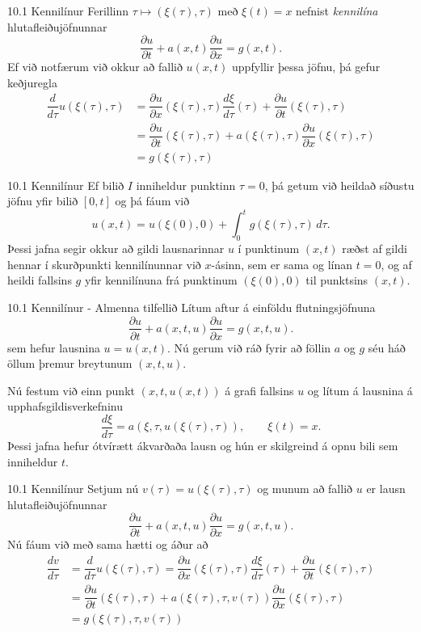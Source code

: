 \begin{frame}{10.1 Kennilínur} 
Ferillinn  $\tau\mapsto (\xi(\tau), \tau)$ með $\xi(t)=x$ nefnist
{\it kennilína} hlutafleiðujöfnunnar
$$
\dfrac{\partial u}{\partial t}
+a(x,t)\dfrac{\partial u}{\partial x}=g(x,t).
$$
Ef við  notfærum við okkur að fallið $u(x,t)$ uppfyllir
þessa jöfnu, þá gefur keðjuregla 
\begin{align*}
\dfrac {d}{d\tau} u(\xi(\tau),\tau)&= 
\dfrac{\partial u}{\partial x}(\xi(\tau),\tau) 
\dfrac{d\xi}{d\tau}(\tau)+
\dfrac{\partial u}{\partial t}(\xi(\tau),\tau)\\
&=\dfrac{\partial u}{\partial t}(\xi(\tau),\tau)
+a(\xi(\tau),\tau)
\dfrac{\partial u}{\partial x}(\xi(\tau),\tau) \\
&=g(\xi(\tau),\tau)  
\end{align*}
\end{frame}


\begin{frame}{10.1 Kennilínur} 
Ef bilið $I$ inniheldur punktinn $\tau=0$, þá getum við heildað
síðustu jöfnu yfir bilið $[0,t]$ og þá fáum við 
$$
u(x,t)=u(\xi(0),0)+\int_0^tg(\xi(\tau),\tau)\, d\tau.
$$
Þessi jafna segir okkur að gildi lausnarinnar $u$ í punktinum $(x,t)$
ræðst af gildi hennar í skurðpunkti kennilínunnar við $x$-ásinn, sem
er sama og línan $t=0$, og af heildi fallsins  $g$ yfir kennilínuna
frá punktinum $(\xi(0),0)$ til punktsins $(x,t)$.
\end{frame}


\begin{frame}{10.1 Kennilínur - Almenna tilfellið} 
Lítum aftur á einföldu flutningsjöfnuna 
$$
\dfrac{\partial u}{\partial t}
+a(x,t,u)\dfrac{\partial u}{\partial x}=g(x,t,u).
$$
sem hefur lausnina $u=u(x,t)$.  Nú gerum við ráð fyrir 
að föllin $a$ og $g$ séu háð öllum þremur breytunum 
$(x,t,u)$. 

\smallskip
Nú festum við einn punkt $(x,t,u(x,t))$ á grafi fallsins 
$u$ og lítum á lausnina á upphafsgildisverkefninu
$$
  \dfrac{d\xi}{d\tau}=a(\xi,\tau,u(\xi(\tau),\tau)), \qquad \xi(t)=x.
$$
Þessi jafna hefur ótvírætt ákvarðaða lausn og hún er skilgreind 
á opnu bili sem inniheldur $t$.  
\end{frame}


\begin{frame}{10.1 Kennilínur} 
Setjum nú $v(\tau)=u(\xi(\tau),\tau)$ og munum að
fallið $u$ er lausn hlutafleiðujöfnunnar
$$
\dfrac{\partial u}{\partial t}
+a(x,t,u)\dfrac{\partial u}{\partial x}=g(x,t,u).
$$
Nú fáum við með sama hætti og áður að
\begin{align*}
\dfrac{dv}{d\tau}&=\dfrac {d}{d\tau} u(\xi(\tau),\tau)= 
\dfrac{\partial u}{\partial x}(\xi(\tau),\tau) 
\dfrac{d\xi}{d\tau}(\tau)+
\dfrac{\partial u}{\partial t}(\xi(\tau),\tau)\\
&=\dfrac{\partial u}{\partial t}(\xi(\tau),\tau)
+a(\xi(\tau),\tau,v(\tau))
\dfrac{\partial u}{\partial x}(\xi(\tau),\tau) \\
&=g(\xi(\tau),\tau,v(\tau))  
\end{align*}
\end{frame}


